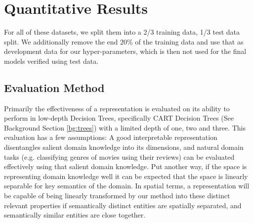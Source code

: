 

\section{Quantitative Results}



 For all of these datasets, we split them into a 2/3 training data, 1/3 test data split. We additionally remove the end 20\% of the training data and use that as development data for our hyper-parameters, which is then not used for the final models verified using test data.  

\subsection{Evaluation Method}

Primarily the effectiveness of a representation is evaluated on its ability to perform in low-depth Decision Trees, specifically CART Decision Trees (See Background Section \ref{bg:trees}) with a limited depth of one, two and three. This evaluation has a few assumptions: A good interpretable representation disentangles salient domain knowledge into its dimensions, and natural domain tasks (e.g. classifying genres of movies using their reviews) can be evaluated effectively using that salient domain knowledge. Put another way, if the space is representing domain knowledge well it can be expected that the space is linearly separable for key semantics of the domain. In spatial terms, a representation will be capable of being linearly transformed by our method into these distinct relevant properties if semantically distinct entities are spatially separated, and semantically similar entities are close together.


